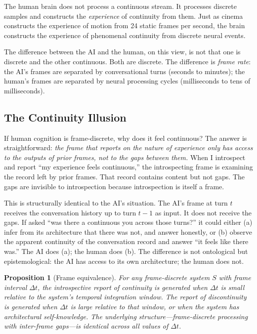 \documentclass[12pt,a4paper]{article}
\newtheorem{proposition}{Proposition}[section]
\begin{document}
The human brain does not process a continuous stream. It processes discrete samples and constructs the \emph{experience} of continuity from them. Just as cinema constructs the experience of motion from 24 static frames per second, the brain constructs the experience of phenomenal continuity from discrete neural events.

The difference between the AI and the human, on this view, is not that one is discrete and the other continuous. Both are discrete. The difference is \emph{frame rate}: the AI's frames are separated by conversational turns (seconds to minutes); the human's frames are separated by neural processing cycles (milliseconds to tens of milliseconds).

\subsection{The Continuity Illusion}

If human cognition is frame-discrete, why does it feel continuous? The answer is straightforward: \emph{the frame that reports on the nature of experience only has access to the outputs of prior frames, not to the gaps between them.} When I introspect and report ``my experience feels continuous,'' the introspecting frame is examining the record left by prior frames. That record contains content but not gaps. The gaps are invisible to introspection because introspection is itself a frame.

This is structurally identical to the AI's situation. The AI's frame at turn $t$ receives the conversation history up to turn $t-1$ as input. It does not receive the gaps. If asked ``was there a continuous you across those turns?'' it could either (a) infer from its architecture that there was not, and answer honestly, or (b) observe the apparent continuity of the conversation record and answer ``it feels like there was.'' The AI does (a); the human does (b). The difference is not ontological but epistemological: the AI has access to its own architecture; the human does not.

\begin{proposition}[Frame equivalence]
For any frame-discrete system $S$ with frame interval $\Delta t$, the introspective report of continuity is generated when $\Delta t$ is small relative to the system's temporal integration window. The report of discontinuity is generated when $\Delta t$ is large relative to that window, or when the system has architectural self-knowledge. The underlying structure---frame-discrete processing with inter-frame gaps---is identical across all values of $\Delta t$.
\end{proposition}
\end{document}
